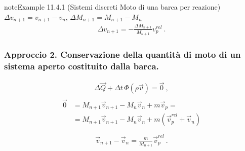 \documentclass[letterpaper,10pt,italian]{jupyterBook}
\begin{document}
\begin{sphinxadmonition}{note}{Example 11.4.1 (Sistemi discreti \sphinxhyphen{} Moto di una barca per reazione)}
\sphinxAtStartPar
\(\Delta v_{n+1} = v_{n+1} - v_n\), \(\Delta M_{n+1} = M_{n+1} - M_{n}\)
\begin{equation*}
\begin{split}\Delta v_{n+1} = - \frac{\Delta M_{n+1}}{M_{n+1}} v_p^{rel} \ .\end{split}
\end{equation*}\subsubsection*{Approccio 2. Conservazione della quantità di moto di un sistema aperto costituito dalla barca.}
\begin{equation*}
\begin{split}\Delta \vec{Q} + \Delta t \, \Phi(\rho \vec{v}) = \vec{0} \ ,\end{split}
\end{equation*}\begin{equation*}
\begin{split}\begin{aligned}
  \vec{0} & = M_{n+1} \vec{v}_{n+1} - M_{n} \vec{v}_n + m \vec{v}_p =  \\
          & = M_{n+1} \vec{v}_{n+1} - M_{n} \vec{v}_n + m ( \vec{v}_p^{rel} + \vec{v}_n )  \\
\end{aligned}\end{split}
\end{equation*}\begin{equation*}
\begin{split}\vec{v}_{n+1} - \vec{v}_n = \frac{m}{M_{n+1}} \vec{v}_p^{rel} \ .\end{split}
\end{equation*}\end{sphinxadmonition}
\label{ch/mechanics/dynamics-eom-open:mechanics:dynamics:open:ex:carousel}
\end{document}
